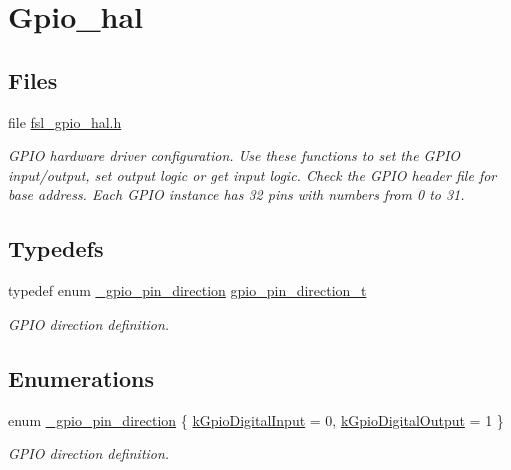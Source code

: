 \hypertarget{group__gpio__hal}{}\section{Gpio\+\_\+hal}
\label{group__gpio__hal}
\subsection*{Files}
\begin{DoxyCompactItemize}
\item 
file \hyperlink{fsl__gpio__hal_8h}{fsl\+\_\+gpio\+\_\+hal.\+h}
\begin{DoxyCompactList}\small\item\em G\+P\+IO hardware driver configuration. Use these functions to set the G\+P\+IO input/output, set output logic or get input logic. Check the G\+P\+IO header file for base address. Each G\+P\+IO instance has 32 pins with numbers from 0 to 31. \end{DoxyCompactList}\end{DoxyCompactItemize}
\subsection*{Typedefs}
\begin{DoxyCompactItemize}
\item 
typedef enum \hyperlink{group__gpio__hal_ga0df4be96fa56f3bdd7bfa048fdaacd6b}{\+\_\+gpio\+\_\+pin\+\_\+direction} \hyperlink{group__gpio__hal_gaf7d75755774a0f20385fbdda546f1f1d}{gpio\+\_\+pin\+\_\+direction\+\_\+t}\hypertarget{group__gpio__hal_gaf7d75755774a0f20385fbdda546f1f1d}{}\label{group__gpio__hal_gaf7d75755774a0f20385fbdda546f1f1d}

\begin{DoxyCompactList}\small\item\em G\+P\+IO direction definition. \end{DoxyCompactList}\end{DoxyCompactItemize}
\subsection*{Enumerations}
\begin{DoxyCompactItemize}
\item 
enum \hyperlink{group__gpio__hal_ga0df4be96fa56f3bdd7bfa048fdaacd6b}{\+\_\+gpio\+\_\+pin\+\_\+direction} \{ \hyperlink{group__gpio__hal_gga0df4be96fa56f3bdd7bfa048fdaacd6babec990a5b8f20f01f2beda22945fe54d}{k\+Gpio\+Digital\+Input} = 0, 
\hyperlink{group__gpio__hal_gga0df4be96fa56f3bdd7bfa048fdaacd6baa00f38f21e6d42b0211d04e53e371247}{k\+Gpio\+Digital\+Output} = 1
 \}\begin{DoxyCompactList}\small\item\em G\+P\+IO direction definition. \end{DoxyCompactList}
\end{DoxyCompactItemize}
